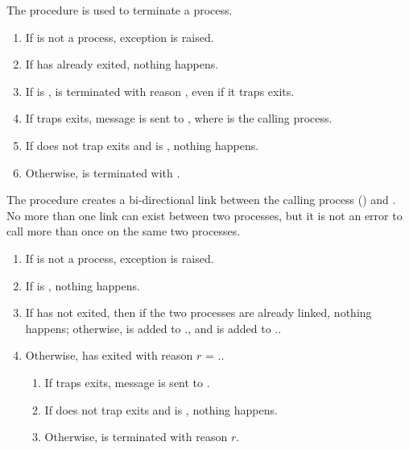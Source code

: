 The  procedure is used to terminate a process.
\begin{enumerate}
\item If  is not a process, exception  is raised.
\item If  has already exited, nothing happens.
\item If  is ,  is terminated
  with reason , even if it traps exits.
\item If  traps exits, message  is sent to , where  is the
  calling process.
\item If  does not trap exits and  is
  , nothing happens.
\item Otherwise,  is terminated with .
\end{enumerate}

\begin{procedure}
\end{procedure}
\returns{} 

The  procedure creates a bi-directional link between the
calling process () and . No more than one link
can exist between two processes, but it is not an error to call
 more than once on the same two processes.

\begin{enumerate}
\item If  is not a process, exception  is raised.
\item If  is , nothing happens.
\item If  has not exited, then if the two processes are
  already linked, nothing happens; otherwise,  is added to
  ., and  is added to
  ..
\item Otherwise,  has exited with reason $r$ =
  ..
  \begin{enumerate}
  \item If  traps exits, message 
    is sent to .
  \item If  does not trap exits and  is ,
    nothing happens.
  \item Otherwise,  is terminated with reason $r$.
  \end{enumerate}
\end{enumerate}

